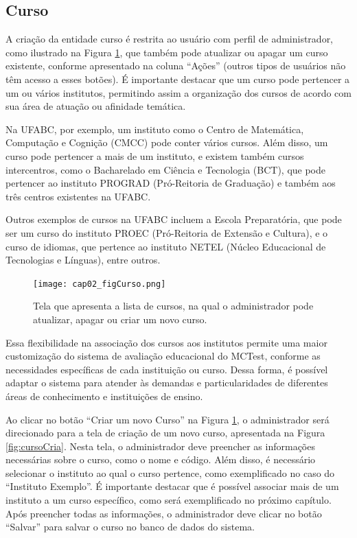 
\subsection{Curso}\label{sec:curso}

A criação da entidade curso é restrita ao usuário com perfil de administrador, como ilustrado na Figura \ref{fig:curso}, que também pode atualizar ou apagar um curso existente, conforme apresentado na coluna ``Ações'' (outros tipos de usuários não têm acesso a esses botões). É importante destacar que um curso pode pertencer a um ou vários institutos, permitindo assim a organização dos cursos de acordo com sua área de atuação ou afinidade temática.

Na UFABC, por exemplo, um instituto como o Centro de Matemática, Computação e Cognição (CMCC) pode conter vários cursos. Além disso, um curso pode pertencer a mais de um instituto, e existem também cursos intercentros, como o Bacharelado em Ciência e Tecnologia (BCT), que pode pertencer ao instituto PROGRAD (Pró-Reitoria de Graduação) e também aos três centros existentes na UFABC.

Outros exemplos de cursos na UFABC incluem a Escola Preparatória, que pode ser um curso do instituto PROEC (Pró-Reitoria de Extensão e Cultura), e o curso de idiomas, que pertence ao instituto NETEL (Núcleo Educacional de Tecnologias e Línguas), entre outros. 

\begin{figure}[!ht]
  \centering
  \texttt{[image: cap02\_figCurso.png]}
  \caption{Tela que apresenta a lista de cursos, na qual o administrador pode atualizar, apagar ou criar um novo curso.}
  \label{fig:curso}
\end{figure}

Essa flexibilidade na associação dos cursos aos institutos permite uma maior customização do sistema de avaliação educacional do MCTest, conforme as necessidades específicas de cada instituição ou curso. Dessa forma, é possível adaptar o sistema para atender às demandas e particularidades de diferentes áreas de conhecimento e instituições de ensino.

Ao clicar no botão ``Criar um novo Curso'' na Figura \ref{fig:curso}, o administrador será direcionado para a tela de criação de um novo curso, apresentada na Figura \ref{fig:cursoCria}. Nesta tela, o administrador deve preencher as informações necessárias sobre o curso, como o nome e código. Além disso, é necessário selecionar o instituto ao qual o curso pertence, como exemplificado no caso do ``Instituto Exemplo''. É importante destacar que é possível associar mais de um instituto a um curso específico, como será exemplificado no próximo capítulo. Após preencher todas as informações, o administrador deve clicar no botão ``Salvar'' para salvar o curso no banco de dados do sistema.

